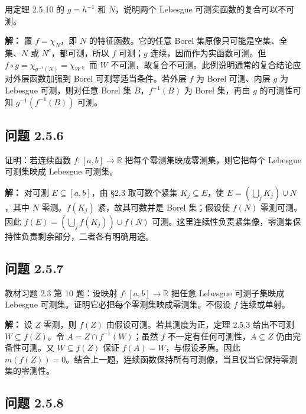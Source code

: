 \documentclass[11pt,a4paper]{article}
\begin{document}
用定理 2.5.10 的 \(g=h^{-1}\) 和 \(N\)，说明两个 Lebesgue
可测实函数的复合可以不可测。

\textbf{解：} 置 \(f=\chi_N\)，即 \(N\) 的特征函数。它的任意 Borel
集原像只可能是空集、全集、\(N\) 或 \(N^c\)，都可测，所以 \(f\)
可测；\(g\) 连续，因而作为实函数可测。但
\(f\circ g=\chi_{g^{-1}(N)}=\chi_W\)，而 \(W\)
不可测，故复合不可测。此例说明通常的复合结论应对外层函数加强到 Borel
可测等适当条件。若外层 \(f\) 为 Borel 可测、内层 \(g\) 为 Lebesgue
可测，则对任意 Borel 集 \(B\)，\(f^{-1}(B)\) 为 Borel 集，再由 \(g\)
的可测性可知 \(g^{-1}(f^{-1}(B))\) 可测。

\subsection{问题 2.5.6}\label{ux95eeux9898-2.5.6}

证明：若连续函数 \(f:[a,b]\to\mathbb R\)
把每个零测集映成零测集，则它把每个 Lebesgue 可测集映成 Lebesgue 可测集。

\textbf{解：} 对可测 \(E\subseteq[a,b]\)，由 §2.3 取可数个紧集
\(K_j\subseteq E\)，使 \(E=(\bigcup_jK_j)\cup N\)，其中 \(N\)
零测。\(f(K_j)\) 紧，故其可数并是 Borel 集；假设使 \(f(N)\)
零测可测。因此 \(f(E)=(\bigcup_j f(K_j))\cup f(N)\)
可测。这里连续性负责紧集像，零测集保持性负责剩余部分，二者各有明确用途。

\subsection{问题 2.5.7}\label{ux95eeux9898-2.5.7}

教材习题 2.3 第 10 题：设映射 \(f:[a,b]\to\mathbb R\) 把任意 Lebesgue
可测子集映成 Lebesgue 可测集。证明它必把每个零测集映成零测集。不假设
\(f\) 连续或单射。

\textbf{解：} 设 \(Z\) 零测，则 \(f(Z)\) 由假设可测。若其测度为正，定理
2.5.3 给出不可测 \(W\subseteq f(Z)\)。令 \(A=Z\cap f^{-1}(W)\)；虽然
\(f\) 不一定有任何可测性，\(A\subseteq Z\) 仍由完备性可测。又
\(W\subseteq f(Z)\) 保证 \(f(A)=W\)，与假设矛盾。因此
\(m(f(Z))=0\)。结合上一题，连续函数保持所有可测像，当且仅当它保持零测集的零测性。

\subsection{问题 2.5.8}\label{ux95eeux9898-2.5.8}
\end{document}
